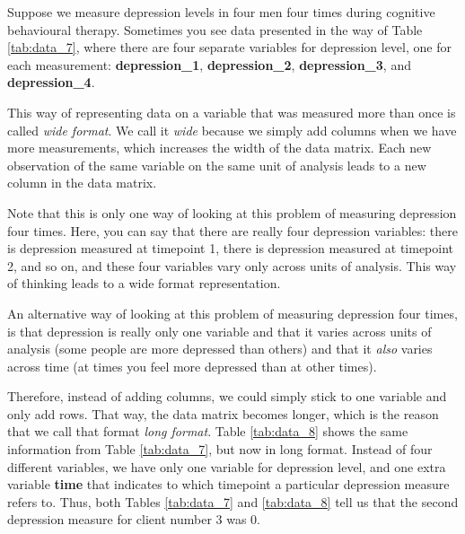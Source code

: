Suppose we measure depression levels in four men four times during cognitive behavioural therapy. Sometimes you see data presented in the way of Table \ref{tab:data_7}, where there are four separate variables for depression level, one for each measurement: \textbf{depression\_1}, \textbf{depression\_2}, \textbf{depression\_3}, and \textbf{depression\_4}.

\begin{kframe}


{\ttfamily\noindent\bfseries{}}\end{kframe}

\begin{kframe}


{\ttfamily\noindent\bfseries{}}\end{kframe}


This way of representing data on a variable that was measured more than once is called \textit{wide format}. We call it \textit{wide} because we simply add columns when we have more measurements, which increases the width of the data matrix. Each new observation of the same variable on the same unit of analysis leads to a new column in the data matrix.

Note that this is only one way of looking at this problem of measuring depression four times. Here, you can say that there are really four depression variables: there is depression measured at timepoint 1, there is depression measured at timepoint 2, and so on, and these four variables vary only across units of analysis. This way of thinking leads to a wide format representation.

An alternative way of looking at this problem of measuring depression four times, is that depression is really only one variable and that it varies across units of analysis (some people are more depressed than others) and that it \textit{also} varies across time (at times you feel more depressed than at other times).

Therefore, instead of adding columns, we could simply stick to one variable and only add rows. That way, the data matrix becomes longer, which is the reason that we call that format \textit{long format}. Table \ref{tab:data_8} shows the same information from Table \ref{tab:data_7}, but now in long format. Instead of four different variables, we have only one variable for depression level, and one extra variable \textbf{time} that indicates to which timepoint a particular depression measure refers to. Thus, both Tables \ref{tab:data_7} and \ref{tab:data_8} tell us that the second depression measure for client number 3 was 0.

